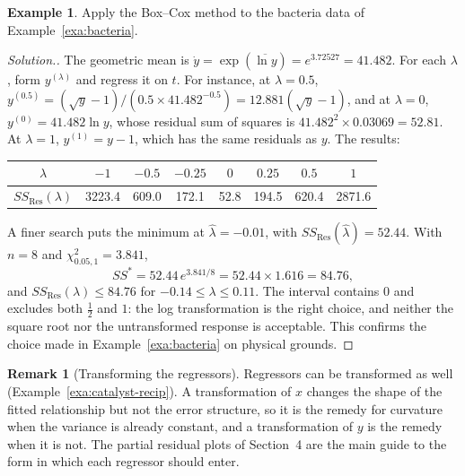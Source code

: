\documentclass[11pt,a4paper]{article}
\numberwithin{equation}{section}
\theoremstyle{definition}
\newtheorem{exa}[thm]{Example}
\newtheorem*{remark}{Remark}
\newenvironment{solution}
  {\renewcommand{\qedsymbol}{}\begin{proof}[\textit{Solution}.]}
  {\end{proof}}
\begin{document}
\begin{exa}\label{exa:bacteria-boxcox}
Apply the Box--Cox method to the bacteria data of Example~\ref{exa:bacteria}.
\end{exa}

\begin{solution}
The geometric mean is $\dot y = \exp(\overline{\ln y}) = e^{3.72527} = 41.482$. For each $\lambda$,
form $y^{(\lambda)}$ and regress it on $t$. For instance, at $\lambda = 0.5$,
$y^{(0.5)} = (\sqrt{y} - 1)/(0.5 \times 41.482^{-0.5}) = 12.881(\sqrt{y} - 1)$, and at $\lambda = 0$,
$y^{(0)} = 41.482\ln y$, whose residual sum of squares is $41.482^2 \times 0.03069 = 52.81$. At
$\lambda = 1$, $y^{(1)} = y - 1$, which has the same residuals as $y$. The results:
\begin{center}
\begin{tabular}{c|ccccccc}
$\lambda$ & $-1$ & $-0.5$ & $-0.25$ & $0$ & $0.25$ & $0.5$ & $1$ \\
\hline
$SS_{\mathrm{Res}}(\lambda)$ & 3223.4 & 609.0 & 172.1 & 52.8 & 194.5 & 620.4 & 2871.6 \\
\end{tabular}
\end{center}
A finer search puts the minimum at $\hat\lambda = -0.01$, with $SS_{\mathrm{Res}}(\hat\lambda) = 52.44$.
With $n = 8$ and $\chi^2_{0.05,1} = 3.841$,
\[
SS^* = 52.44\, e^{3.841/8} = 52.44 \times 1.616 = 84.76 ,
\]
and $SS_{\mathrm{Res}}(\lambda) \le 84.76$ for $-0.14 \le \lambda \le 0.11$. The interval contains $0$ and
excludes both $\frac12$ and $1$: the log transformation is the right choice, and neither the
square root nor the untransformed response is acceptable. This confirms the choice made in
Example~\ref{exa:bacteria} on physical grounds.
\end{solution}

\begin{remark}[Transforming the regressors]
Regressors can be transformed as well (Example~\ref{exa:catalyst-recip}). A
transformation of $x$ changes the shape of the fitted relationship but not the error structure, so it is the remedy
for curvature when the variance is already constant, and a transformation of $y$ is the remedy
when it is not. The partial residual plots of Section~4 are the main guide to the form in which
each regressor should enter.
\end{remark}
\end{document}
